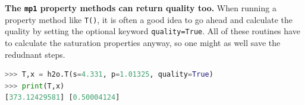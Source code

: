 {\bf The \texttt{mp1} property methods can return quality too.}  When running a property method like \verb|T()|, it is often a good idea to go ahead and calculate the quality by setting the optional keyword \verb|quality=True|.  All of these routines have to calculate the saturation properties anyway, so one might as well save the redudnant steps.
\begin{lstlisting}[language=Python]
>>> T,x = h2o.T(s=4.331, p=1.01325, quality=True)
>>> print(T,x)
[373.12429581] [0.50004124]
\end{lstlisting}
